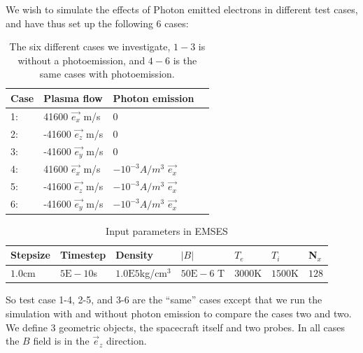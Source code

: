 We wish to simulate the effects of Photon emitted electrons in different test cases, and have thus set up the following
6 cases:
\begin{table}
\begin{center}
    \begin{tabular}{ | l | l | l | p{5cm} |}
    \hline
    Case & Plasma flow & Photon emission  \\ \hline
     1: & 41600 $\vec{e_x}$ m/s  & 0 \\ \hline
     2: & -41600 $\vec{e_z}$ m/s & 0 \\ \hline
     3: & -41600 $\vec{e_y}$ m/s & 0 \\ \hline
     4: & 41600 $\vec{e_x}$ m/s & $-10^{-3} A/m^{3}$ $\vec{e_x}$\\ \hline
     5: & -41600 $\vec{e_z}$ m/s & $-10^{-3} A/m^{3}$ $\vec{e_x}$\\ \hline
     6: & -41600 $\vec{e_y}$ m/s & $-10^{-3} A/m^{3}$  $\vec{e_x}$\\
    \hline
    \end{tabular}
\end{center}
	\caption{The six different cases we investigate, \(1-3\) is without a photoemission, and \(4-6\) is the same cases with photoemission.}
\end{table}

	\begin{table}[h]
		\centering
	    \begin{tabular}{ | l | l | l| l| l | l | l |}
	    \hline
		Stepsize & Timestep & Density &\(|B|\) & \(T_e\) & \(T_i\) & N\(_x\)\\
		\hline
		\(1.0\)cm & \(5\text{E}-10\)s & \(1.0\text{E}5\)kg/cm\(^3\) &  \(50\text{E}-6\) T & \(3000\)K & \(1500\)K  & \(128\)\\
	    \hline
	    \end{tabular}
		\caption{Input parameters in EMSES}
	\end{table}

So test case 1-4, 2-5, and 3-6 are the ``same'' cases except that we run the simulation with and without
photon emission to compare the cases two and two. We define 3 geometric objects, the spacecraft itself
and two probes. In all cases the $B$ field is in the $\vec e_z$ direction.

